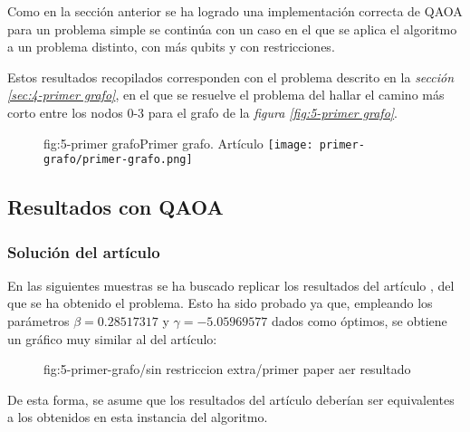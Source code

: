 Como en la sección anterior se ha logrado una implementación correcta de QAOA para un problema simple se continúa con un caso en el que se aplica el algoritmo a un problema distinto, con más qubits y con restricciones.

Estos resultados recopilados corresponden con el problema descrito en la \textit{sección \ref{sec:4-primer grafo}}, en el que se resuelve el problema del hallar el camino más corto entre los nodos 0-3 para el grafo de la \textit{figura \ref{fig:5-primer grafo}}.

\begin{figure}[htbp]{fig:5-primer grafo}{Primer grafo. Artículo \cite{multi-objective_routing_optimization}}
  \centering
  \texttt{[image: primer-grafo/primer-grafo.png]}
\end{figure}

\subsection{Resultados con QAOA}

\subsubsection{Solución del artículo}
\label{sec:5-primer-paper-resultados-qiskit}
En las siguientes muestras se ha buscado replicar los resultados del artículo \cite{multi-objective_routing_optimization}, del que se ha obtenido el problema. Esto ha sido probado ya que, empleando los parámetros \(\beta = 0.28517317\) y \(\gamma = -5.05969577 \) dados como óptimos, se obtiene un gráfico muy similar al del artículo:

\begin{figure}[]{fig:5-primer-grafo/sin restriccion extra/primer paper aer resultado}{}
   \hfill
\end{figure}

De esta forma, se asume que los resultados del artículo deberían ser equivalentes a los obtenidos en esta instancia del algoritmo.

